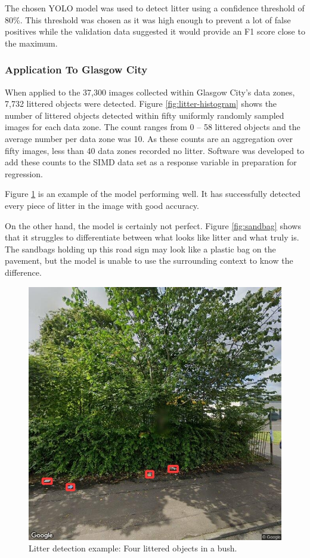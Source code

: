 \documentclass{thesis}
\begin{document}
The chosen YOLO model was used to detect litter using a confidence threshold of 80\%. This threshold was chosen as it was high enough to prevent a lot of false positives while the validation data suggested it would provide an F1 score close to the maximum.

\subsubsection{Application To Glasgow City}

When applied to the 37,300 images collected within Glasgow City's data zones, 7,732 littered objects were detected. Figure \ref{fig:litter-histogram} shows the number of littered objects detected within fifty uniformly randomly sampled images for each data zone. The count ranges from 0 -- 58 littered objects and the average number per data zone was 10. As these counts are an aggregation over fifty images, less than 40 data zones recorded no litter. Software was developed to add these counts to the SIMD data set as a response variable in preparation for regression.

Figure \ref{fig:4-in-bush} is an example of the model performing well. It has successfully detected every piece of litter in the image with good accuracy. 

On the other hand, the model is certainly not perfect. Figure \ref{fig:sandbag} shows that it struggles to differentiate between what looks like litter and what truly is. The sandbags holding up this road sign may look like a plastic bag on the pavement, but the model is unable to use the surrounding context to know the difference.

\newpage
{}
\begin{figure}[h!]
    \centering
    \includegraphics[scale=0.45]{images/good-4-in-bush.jpg}
    \caption{Litter detection example: Four littered objects in a bush.}
    \label{fig:4-in-bush}
\end{figure}
\end{document}
